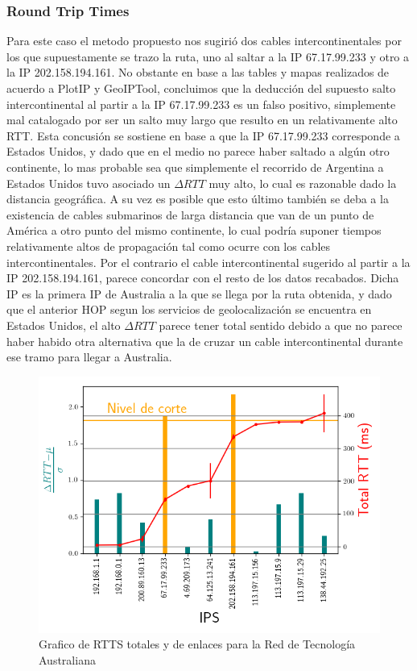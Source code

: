 \subsubsection{Round Trip Times}

Para este caso el metodo propuesto nos sugirió dos cables intercontinentales
por los que supuestamente se trazo la ruta, uno al saltar a la IP 67.17.99.233
y otro a la IP 202.158.194.161. No obstante en base a las tables y mapas
realizados de acuerdo a PlotIP y GeoIPTool, concluimos que la deducción del
supuesto salto intercontinental al partir a la IP 67.17.99.233 es un falso
positivo, simplemente mal catalogado por ser un salto muy largo que resulto en
un relativamente alto RTT. Esta concusión se sostiene en base a que la IP
67.17.99.233 corresponde a Estados Unidos, y dado que en el medio no parece
haber saltado a algún otro continente, lo mas probable sea que simplemente el
recorrido de Argentina a Estados Unidos tuvo asociado un $\Delta RTT$ muy alto,
lo cual es razonable dado la distancia geográfica. A su vez es posible que esto
último también se deba a la existencia de cables submarinos de larga distancia
que van de un punto de América a otro punto del mismo continente, lo cual
podría suponer tiempos relativamente altos de propagación tal como ocurre con
los cables intercontinentales. Por el contrario el cable intercontinental
sugerido al partir a la IP 202.158.194.161, parece concordar con el resto de
los datos recabados. Dicha IP es la primera IP de Australia a la que se llega
por la ruta obtenida, y dado que el anterior HOP segun los servicios de
geolocalización se encuentra en Estados Unidos, el alto $\Delta RTT$ parece
tener total sentido debido a que no parece haber habido otra alternativa que la
de cruzar un cable intercontinental durante ese tramo para llegar a Australia.

\begin{figure}[ht]\label{fig:rtts_tsu}
	\begin{center}
		\includegraphics[width=0.6\columnwidth]{imagenes/rtts_australia.png}
		\caption{Grafico de RTTS totales y de enlaces para la Red de Tecnología Australiana}
	\end{center}
\end{figure}

